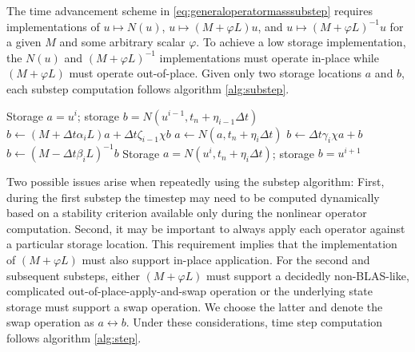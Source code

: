 \documentclass[letterpaper,11pt,nointlimits,reqno]{amsart}
\begin{document}
The time advancement scheme in \eqref{eq:generaloperatormasssubstep} requires
implementations of $u\mapsto{}{N}\left(u\right)$,
$u\mapsto{}\left(M+\varphi{}L\right)u$, and
$u\mapsto{}\left(M+\varphi{}L\right)^{-1}u$ for a given $M$ and some arbitrary
scalar $\varphi$.  To achieve a low storage implementation, the
$N\left(u\right)$ and $\left(M+\varphi{}L\right)^{-1}$ implementations must
operate in-place while $\left(M+\varphi{}L\right)$ must operate out-of-place.
Given only two storage locations $a$ and $b$, each substep computation follows
algorithm \vref{alg:substep}.

\begin{algorithm}
\label{alg:substep}
\caption{Compute one substep in the SMR scheme following
         equation (\ref{eq:generaloperatormasssubstep}) %
         }
\begin{algorithmic}
  \REQUIRE Storage $a = u^i$;
           storage $b = N\left(u^{i-1},t_{n}+\eta_{i-1}\Delta{}t\right)$
  \STATE $b\leftarrow{}   \left(M+\Delta{}t\alpha_{i}L\right)a
                        + \Delta{}t\zeta_{i-1}\chi{}b$
  \STATE $a\leftarrow{}N\left(a,t_{n}+\eta_{i}\Delta{}t\right)$
  \STATE $b\leftarrow{}\Delta{}t\gamma_{i}\chi{}a + b$
  \STATE $b\leftarrow{}\left(M-\Delta{}t\beta_{i}L\right)^{-1}b$
  \ENSURE Storage $a = N\left(u^{i},t_{n}+\eta_{i}\Delta{}t\right)$;
          storage $b = u^{i+1}$
\end{algorithmic}
\end{algorithm}

Two possible issues arise when repeatedly using the substep algorithm: First,
during the first substep the timestep may need to be computed dynamically based
on a stability criterion available only during the nonlinear operator
computation.  Second, it may be important to always apply each operator against
a particular storage location.  This requirement implies that the
implementation of $\left(M+\varphi{}L\right)$ must also support in-place
application.  For the second and subsequent substeps, either
$\left(M+\varphi{}L\right)$ must support a decidedly non-BLAS-like, complicated
out-of-place-apply-and-swap operation or the underlying state storage must
support a swap operation.  We choose the latter and denote the swap operation
as $a\leftrightarrow{}b$.  Under these considerations, time step computation
follows algorithm \vref{alg:step}.
\end{document}
